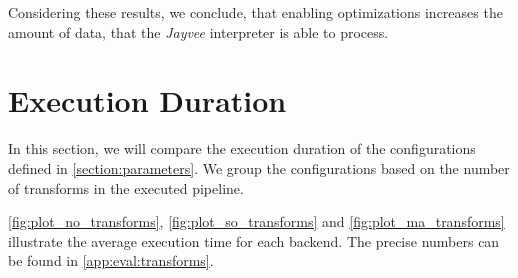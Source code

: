 Considering these results, we conclude, that enabling optimizations increases the amount of data, that the \emph{Jayvee} interpreter is able to process.


\section{Execution Duration}
\label{eval:numbers}
In this section, we will compare the execution duration of the configurations defined in \autoref{section:parameters}.
We group the configurations based on the number of transforms in the executed pipeline.

\autoref{fig:plot_no_transforms}, \autoref{fig:plot_so_transforms} and \autoref{fig:plot_ma_transforms}  illustrate the average execution time for each backend.
The precise numbers can be found in \autoref{app:eval:transforms}.

